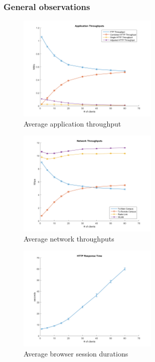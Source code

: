 \documentclass[
10pt, %
a4paper, %
oneside, %
headinclude,footinclude, %
BCOR5mm, %
]{scrartcl}
\begin{document}
\subsubsection{General observations}
\begin{figure}[!ht]
  \centering
  \includegraphics[width=0.6\textwidth]{Figures/nocctv/Application_Throughputs.png}
  \caption{Average application throughput} \label{fig:app_throughput}
\end{figure}
\begin{figure}[!ht]
  \centering
  \includegraphics[width=0.6\textwidth]{Figures/nocctv/Network_Throughputs.png}
  \caption{Average network throughputs} \label{fig:net_throughput}
\end{figure}

\begin{figure}[!ht]
  \centering
  \includegraphics[width=0.6\textwidth]{Figures/nocctv/HTTP_Response_Time.png}
  \caption{Average browser session durations} \label{fig:browser_sess_dur}
\end{figure}
\end{document}
